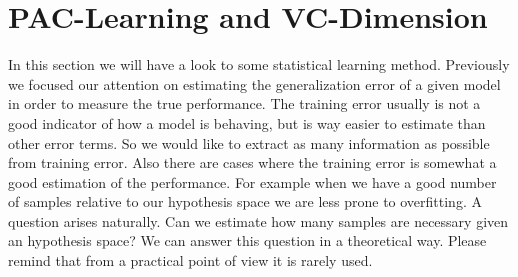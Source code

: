\documentclass[main.tex]{subfiles}
\begin{document}
\section{PAC-Learning and VC-Dimension}
In this section we will have a look to some statistical learning method.
Previously we focused our attention on estimating the generalization error of a given model in order to measure the true performance. The training error usually is not a good indicator of how a model is behaving, but is way easier to estimate than other error terms. So we would like to extract as many information as possible from training error. Also there are cases where the training error is somewhat a good estimation of the performance. For example when we have a good number of samples relative to our hypothesis space we are less prone to overfitting. A question arises naturally. Can we estimate how many samples are necessary given an hypothesis space? We can answer this question in a theoretical way. Please remind that from a practical point of view it is rarely used.
\end{document}

